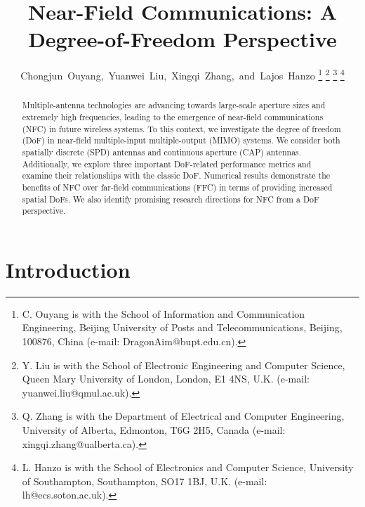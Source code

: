 \documentclass[journal]{IEEEtran}
\theoremstyle{definition}
\begin{document}
\title{Near-Field Communications: A Degree-of-Freedom Perspective}%
\author{Chongjun~Ouyang,~Yuanwei~Liu,~Xingqi~Zhang,~and~Lajos~Hanzo
\thanks{C. Ouyang is with the School of Information and Communication Engineering, Beijing University of Posts and Telecommunications, Beijing, 100876, China (e-mail: DragonAim@bupt.edu.cn).}
\thanks{Y. Liu is with the School of Electronic Engineering and Computer Science, Queen Mary University of London, London, E1 4NS, U.K. (e-mail: yuanwei.liu@qmul.ac.uk).}
\thanks{Q. Zhang is with the Department of Electrical and Computer Engineering, University of Alberta, Edmonton, T6G 2H5, Canada (e-mail: xingqi.zhang@ualberta.ca).}
\thanks{L. Hanzo is with the School of Electronics and Computer Science, University of Southampton, Southampton, SO17 1BJ, U.K. (e-mail: lh@ecs.soton.ac.uk).}}

\maketitle

\begin{abstract}
Multiple-antenna technologies are advancing towards large-scale aperture sizes and extremely high frequencies, leading to the emergence of near-field communications (NFC) in future wireless systems. To this context, we investigate the degree of freedom (DoF) in near-field multiple-input multiple-output (MIMO) systems. We consider both spatially discrete (SPD) antennas and continuous aperture (CAP) antennas. Additionally, we explore three important DoF-related performance metrics and examine their relationships with the classic DoF. Numerical results demonstrate the benefits of NFC over far-field communications (FFC) in terms of providing increased spatial DoFs. We also identify promising research directions for NFC from a DoF perspective.
\end{abstract}

\section{Introduction}

\end{document}
